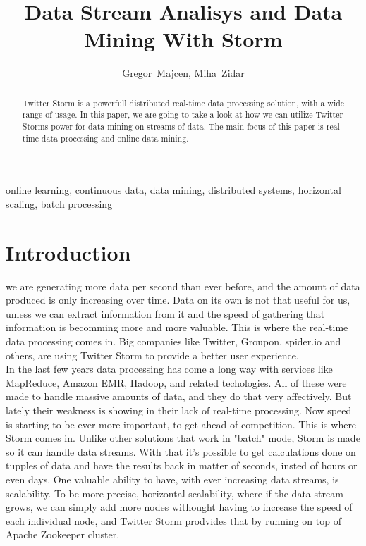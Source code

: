 \documentclass[journal]{IEEEtran/IEEEtran}
\begin{document}
\title{Data Stream Analisys and Data Mining With Storm}

\author{Gregor~Majcen, Miha~Zidar}%
\maketitle
\begin{abstract}
    Twitter Storm is a powerfull distributed real-time data processing solution, with a wide range of usage. In this paper, we are going to take a look at how we can utilize Twitter Storms power for data mining on streams of data. The main focus of this paper is real-time data processing and online data mining.
\end{abstract}

\begin{IEEEkeywords}
    online learning, continuous data, data mining, distributed systems, horizontal scaling, batch processing
\end{IEEEkeywords}

\IEEEpeerreviewmaketitle


\section{Introduction}
 we are generating more data per second than ever before, and the amount of data produced is only increasing over time. Data on its own is not that useful for us, unless we can extract information from it and the speed of gathering that information is becomming more and more valuable. This is where the real-time data processing comes in. Big companies like Twitter, Groupon, spider.io and others, are using Twitter Storm to provide a better user experience.\\

In the last few years data processing has come a long way with services like MapReduce, Amazon EMR, Hadoop, and related techologies. All of these were made to handle massive amounts of data, and they do that very affectively. But lately their weakness is showing in their lack of real-time processing. Now speed is starting to be ever more important, to get ahead of competition. This is where Storm comes in. Unlike other solutions that work in "batch" mode, Storm is made so it can handle data streams. With that it's possible to get calculations done on tupples of data and have the results back in matter of seconds, insted of hours or even days. One valuable ability to have, with ever increasing data streams, is scalability. To be more precise, horizontal scalability, where if the data stream grows, we can simply add more nodes withought having to increase the speed of each individual node, and Twitter Storm prodvides that by running on top of Apache Zookeeper cluster.
\end{document}
